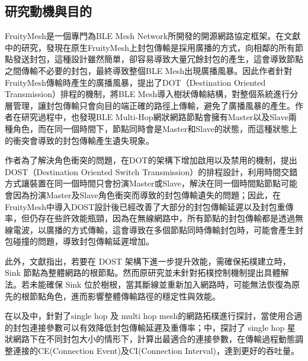 \begin{ZhChapter}
	

\section{研究動機與目的}

FruityMesh是一個專門為BLE Mesh Network所開發的開源網路協定框架。在文獻\cite{112TIT00392032}中的研究，發現在原生FruityMesh上封包傳輸是採用廣播的方式，向相鄰的所有節點發送封包，這種設計雖然簡單，卻容易導致大量冗餘封包的產生，這會導致節點之間傳輸不必要的封包，最終導致整個BLE Mesh出現廣播風暴。因此\cite{112TIT00392032}作者針對FruityMesh傳輸時產生的廣播風暴，提出了DOT（Destination Oriented Transmission）排程的機制，將BLE Mesh導入樹狀傳輸結構，對整個系統進行分層管理，讓封包傳輸只會向目的端正確的路徑上傳輸，避免了廣播風暴的產生。作者在研究過程中，也發現BLE Multi-Hop網狀網路節點會擁有Master以及Slave兩種角色，而在同一個時間下，節點同時會是Master和Slave的狀態，而這種狀態上的衝突會導致的封包傳輸產生遺失現象。

\cite{112TIT00392032}作者為了解決角色衝突的問題，在DOT的架構下增加啟用以及禁用的機制，提出DOST（Destination Oriented Switch Transmission）的排程設計，利用時間交錯方式讓裝置在同一個時間只會扮演Master或Slave，解決在同一個時間點節點可能會因為扮演Master及Slave角色衝突而導致的封包傳輸遺失的問題；因此，在FruityMesh中導入DOST設計後已經改善了大部分的封包傳輸延遲以及封包重傳率，但仍存在些許效能瓶頸，因為在無線網路中，所有節點的封包傳輸都是透過無線電波，以廣播的方式傳輸，這會導致在多個節點同時傳輸封包時，可能會產生封包碰撞的問題，導致封包傳輸延遲增加。


此外，\cite{112TIT00392032}文獻指出，若要在 DOST 架構下進一步提升效能，需確保拓樸建立時，Sink 節點為整體網路的根節點。然而原研究並未針對拓樸控制機制提出具體解法。若未能確保 Sink 位於樹根，當其斷線並重新加入網路時，可能無法恢復為原先的根節點角色，進而影響整體傳輸路徑的穩定性與效能。

在\cite{112TIT00392032}以及\cite{110TIT00392037}中，針對了single hop 及 multi hop mesh的網路拓樸進行探討，當使用合適的封包連接參數可以有效降低封包傳輸延遲及重傳率；\cite{109TIT00392031}中，探討了 single hop 星狀網路下在不同封包大小的情形下，計算出最適合的連接參數，在傳輸過程動態調整連接的CE(Connection Event)及CI(Connection Interval)，達到更好的吞吐量。



\end{ZhChapter}
